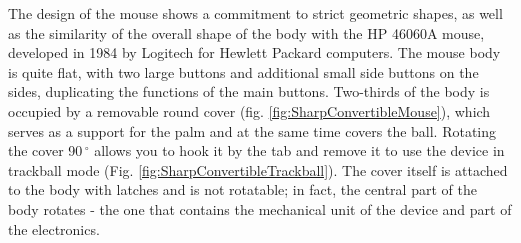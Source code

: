 \documentclass[11pt, a4paper]{article}
\begin{document}
The design of the mouse shows a commitment to strict geometric shapes, as well as the similarity of the overall shape of the body with the HP 46060A mouse, developed in 1984 by Logitech for Hewlett Packard computers. The mouse body is quite flat, with two large buttons and additional small side buttons on the sides, duplicating the functions of the main \cite{JapaneseVintage} buttons. Two-thirds of the body is occupied by a removable round cover (fig. \ref{fig:SharpConvertibleMouse}), which serves as a support for the palm and at the same time covers the ball. Rotating the cover 90\,$^\circ$ allows you to hook it by the tab and remove it to use the device in trackball mode (Fig. \ref{fig:SharpConvertibleTrackball}). The cover itself is attached to the body with latches and is not rotatable; in fact, the central part of the body rotates - the one that contains the mechanical unit of the device and part of the electronics.
\end{document}
